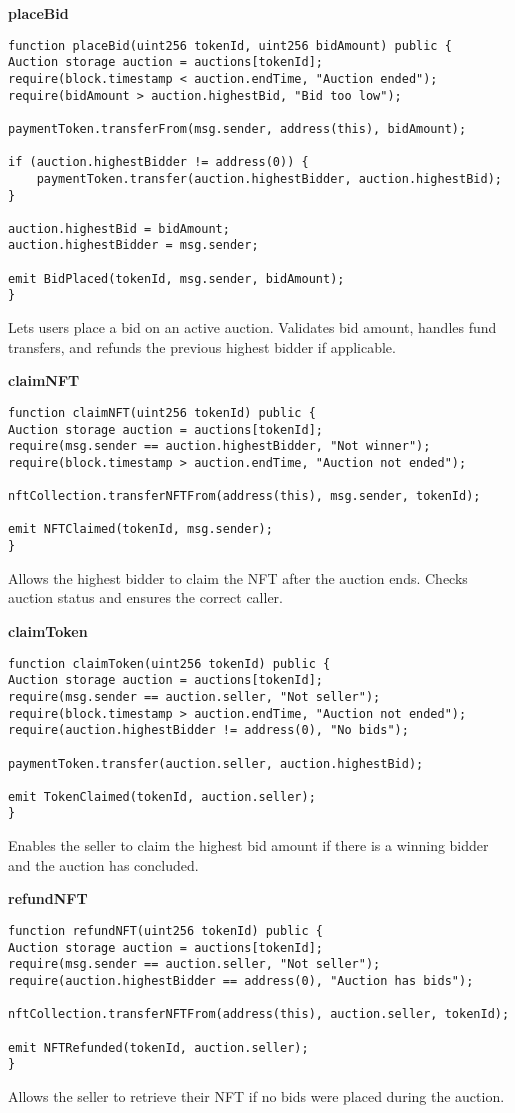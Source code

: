 \documentclass{article}
\begin{document}
\textbf{placeBid}
\begin{lstlisting}[language=Solidity]
function placeBid(uint256 tokenId, uint256 bidAmount) public {
Auction storage auction = auctions[tokenId];
require(block.timestamp < auction.endTime, "Auction ended");
require(bidAmount > auction.highestBid, "Bid too low");

paymentToken.transferFrom(msg.sender, address(this), bidAmount);

if (auction.highestBidder != address(0)) {
    paymentToken.transfer(auction.highestBidder, auction.highestBid);
}

auction.highestBid = bidAmount;
auction.highestBidder = msg.sender;

emit BidPlaced(tokenId, msg.sender, bidAmount);
}
\end{lstlisting}
Lets users place a bid on an active auction. Validates bid amount, handles fund transfers, and refunds the previous highest bidder if applicable.

\textbf{claimNFT}
\begin{lstlisting}[language=Solidity]
function claimNFT(uint256 tokenId) public {
Auction storage auction = auctions[tokenId];
require(msg.sender == auction.highestBidder, "Not winner");
require(block.timestamp > auction.endTime, "Auction not ended");

nftCollection.transferNFTFrom(address(this), msg.sender, tokenId);

emit NFTClaimed(tokenId, msg.sender);
}
\end{lstlisting}
Allows the highest bidder to claim the NFT after the auction ends. Checks auction status and ensures the correct caller.

\textbf{claimToken}
\begin{lstlisting}[language=Solidity]
function claimToken(uint256 tokenId) public {
Auction storage auction = auctions[tokenId];
require(msg.sender == auction.seller, "Not seller");
require(block.timestamp > auction.endTime, "Auction not ended");
require(auction.highestBidder != address(0), "No bids");

paymentToken.transfer(auction.seller, auction.highestBid);

emit TokenClaimed(tokenId, auction.seller);
}
\end{lstlisting}
Enables the seller to claim the highest bid amount if there is a winning bidder and the auction has concluded.

\textbf{refundNFT}
\begin{lstlisting}[language=Solidity]
function refundNFT(uint256 tokenId) public {
Auction storage auction = auctions[tokenId];
require(msg.sender == auction.seller, "Not seller");
require(auction.highestBidder == address(0), "Auction has bids");

nftCollection.transferNFTFrom(address(this), auction.seller, tokenId);

emit NFTRefunded(tokenId, auction.seller);
}
\end{lstlisting}
Allows the seller to retrieve their NFT if no bids were placed during the auction.
\end{document}

